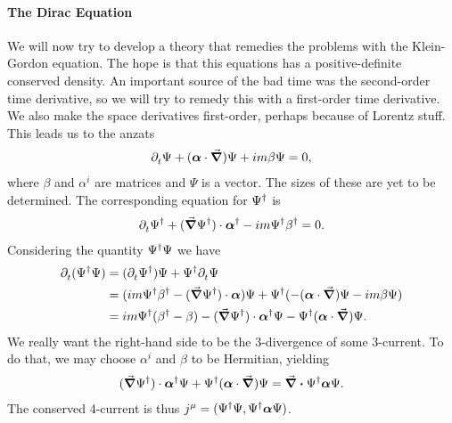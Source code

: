 \paragraph{The Dirac Equation}
We will now try to develop a theory that remedies the problems with the Klein-Gordon equation. The hope is that this equations has a positive-definite conserved density. An important source of the bad time was the second-order time derivative, so we will try to remedy this with a first-order time derivative. We also make the space derivatives first-order, perhaps because of Lorentz stuff. This leads us to the anzats
\begin{align*}
	\partial^{}_{t}{\Psi} + (\vb*{\alpha}\cdot\grad{})\Psi + im\beta\Psi = 0,
\end{align*}
where $\beta$ and $\alpha^{i}$ are matrices and $\Psi$ is a vector. The sizes of these are yet to be determined. The corresponding equation for $\Psi^{\dagger}$ is
\begin{align*}
	\partial^{}_{t}{\Psi^{\dagger}} + (\grad{\Psi\ensuremath{^{\dagger}}})\cdot\vb*{\alpha}^{\dagger} - im\Psi^{\dagger}\beta^{\dagger} = 0.
\end{align*}
Considering the quantity $\Psi^{\dagger}\Psi$ we have
\begin{align*}
	\partial^{}_{t}{(\Psi^{\dagger}\Psi)} &= (\partial^{}_{t}{\Psi^{\dagger}})\Psi + \Psi^{\dagger}\partial^{}_{t}{\Psi} \\
	                        &= (im\Psi^{\dagger}\beta^{\dagger} - (\grad{\Psi\ensuremath{^{\dagger}}})\cdot\vb*{\alpha})\Psi + \Psi^{\dagger}(-(\vb*{\alpha}\cdot\grad{})\Psi - im\beta\Psi) \\
	                        &= im\Psi^{\dagger}(\beta^{\dagger} - \beta) - (\grad{\Psi\ensuremath{^{\dagger}}})\cdot\vb*{\alpha}^{\dagger}\Psi - \Psi^{\dagger}(\vb*{\alpha}\cdot\grad{})\Psi.
\end{align*}
We really want the right-hand side to be the 3-divergence of some 3-current. To do that, we may choose $\alpha^{i}$ and $\beta$ to be Hermitian, yielding
\begin{align*}
	(\grad{\Psi\ensuremath{^{\dagger}}})\cdot\vb*{\alpha}^{\dagger}\Psi + \Psi^{\dagger}(\vb*{\alpha}\cdot\grad{})\Psi = \div{\Psi\ensuremath{^{\dagger}}\vb*{\alpha}\Psi}.
\end{align*}
The conserved 4-current is thus $j^{\mu} = (\Psi^{\dagger}\Psi, \Psi^{\dagger}\vb*{\alpha}\Psi)$.

